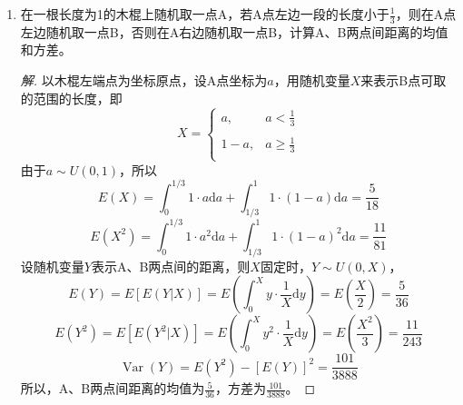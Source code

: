 \documentclass[12pt]{article}
\newcommand{\hei}{\CJKfamily{hei}}                          %
\begin{document}
\begin{enumerate}
\newpage
\item {\hei 在一根长度为1的木棍上随机取一点A，若A点左边一段的长度小于$ \displaystyle{\frac{1}{3}} $，则在A点左边随机取一点B，否则在A右边随机取一点B，计算A、B两点间距离的均值和方差。}
\begin{proof}[解]
	以木棍左端点为坐标原点，设A点坐标为$ a $，用随机变量$ X $来表示B点可取的范围的长度，即
	\begin{equation}
	X=\left\{ \begin{matrix}
	a,&a<\displaystyle{\frac{1}{3}}  \\
	\\
	1-a,&a\ge \displaystyle{\frac{1}{3}}  \\
	\end{matrix} \right.
	\end{equation}
	由于$ a\sim U\left( 0,1 \right) $，所以
	\begin{equation}
	E\left( X \right)=\int_{0}^{1/3}{1\cdot a\text{d}a}+\int_{1/3}^{1}{1\cdot \left( 1-a \right)}\text{d}a=\frac{5}{18}
	\end{equation}
	\begin{equation}
	E\left( {{X}^{2}} \right)=\int_{0}^{1/3}{1\cdot {{a}^{2}}\text{d}a}+\int_{1/3}^{1}{1\cdot {{\left( 1-a \right)}^{2}}}\text{d}a=\frac{11}{81}
	\end{equation}
	设随机变量$ Y $表示A、B两点间的距离，则$ X $固定时，$ Y \sim U\left( 0,X \right) $，
	\begin{equation}
	E\left( Y \right)=E\left[ E\left( Y\left| X \right. \right) \right]=E\left( \int_{0}^{X}{y\cdot \frac{1}{X}\text{d}y} \right)=E\left( \frac{X}{2} \right)=\frac{5}{36}
	\end{equation}
	\begin{equation}
	E\left( {{Y}^{2}} \right)=E\left[ E\left( {{Y}^{2}}\left| X \right. \right) \right]=E\left( \int_{0}^{X}{{{y}^{2}}\cdot \frac{1}{X}\text{d}y} \right)=E\left( \frac{{{X}^{2}}}{3} \right)=\frac{11}{243}
	\end{equation}
	\begin{equation}
	\operatorname{Var}\left( Y \right)=E\left( {{Y}^{2}} \right)-{{\left[ E\left( Y \right) \right]}^{2}}=\frac{101}{3888}
	\end{equation}
	所以，A、B两点间距离的均值为$ \displaystyle{\frac{5}{36}} $，方差为$ \displaystyle{\frac{101}{3888}} $。
\end{proof}



\end{enumerate}
\end{document}
